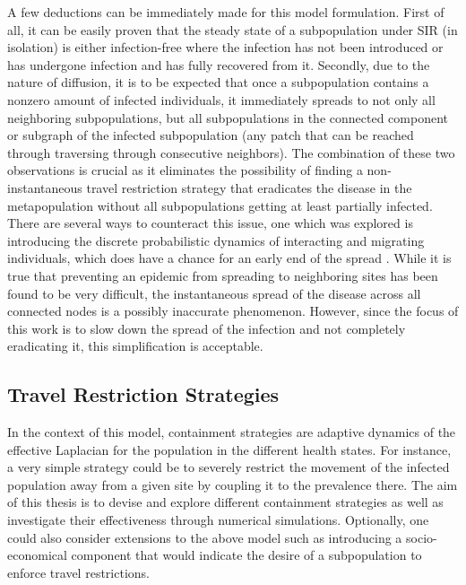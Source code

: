 A few deductions can be immediately made for this model formulation. First of all, it can be easily proven that the steady state of a subpopulation under SIR (in isolation) is either infection-free where the infection has not been introduced or has undergone infection and has fully recovered from it. Secondly, due to the nature of diffusion, it is to be expected that once a subpopulation contains a nonzero amount of infected individuals, it immediately spreads to not only all neighboring subpopulations, but all subpopulations in the connected component or subgraph of the infected subpopulation (any patch that can be reached through traversing through consecutive neighbors). The combination of these two observations is crucial as it eliminates the possibility of finding a non-instantaneous travel restriction strategy that eradicates the disease in the metapopulation without all subpopulations getting at least partially infected. There are several ways to counteract this issue, one which was explored is introducing the discrete probabilistic dynamics of interacting and migrating individuals, which does have a chance for an early end of the spread \cite{colizza2008epidemic}. While it is true that preventing an epidemic from spreading to neighboring sites has been found to be very difficult, the instantaneous spread of the disease across all connected nodes is a possibly inaccurate phenomenon. However, since the focus of this work is to slow down the spread of the infection and not completely eradicating it, this simplification is acceptable. \\

\subsection{Travel Restriction Strategies}
In the context of this model, containment strategies are adaptive dynamics of the effective Laplacian for the population in the different health states. For instance, a very simple strategy could be to severely restrict the movement of the infected population away from a given site by coupling it to the prevalence there. The aim of this thesis is to devise and explore different containment strategies as well as investigate their effectiveness through numerical simulations. Optionally, one could also consider extensions to the above model such as introducing a socio-economical component that would indicate the desire of a subpopulation to enforce travel restrictions.\cite{colizza2007reaction}\\

